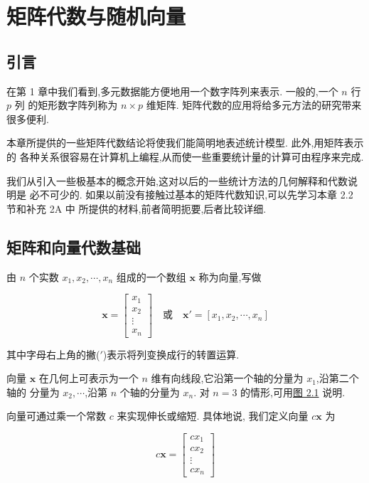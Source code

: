 \chapter{矩阵代数与随机向量}
\label{chap:2}

\section{引言}  %
\label{sec:2.1}

在第 1 章中我们看到,多元数据能方便地用一个数字阵列来表示. 一般的,一个 $n$ 行 $p$ 列
的矩形数字阵列称为 $n\times p$ 维矩阵. 矩阵代数的应用将给多元方法的研究带来很多便利.

本章所提供的一些矩阵代数结论将使我们能简明地表述统计模型. 此外,用矩阵表示的
各种关系很容易在计算机上编程,从而使一些重要统计量的计算可由程序来完成.

我们从引入一些极基本的概念开始,这对以后的一些统计方法的几何解释和代数说明是
必不可少的. 如果以前没有接触过基本的矩阵代数知识,可以先学习本章 2.2 节和补充 2A 中
所提供的材料,前者简明扼要,后者比较详细.

\section{矩阵和向量代数基础}  %
\label{sec:2.2}


由 $n$ 个实数 $x_1,x_2,\cdots,x_n$ 组成的一个数组 $\bm{x}$ 称为向量,写做

\[
\bm{x}=\begin{bmatrix}x_1\\x_2\\\vdots\\x_n\end{bmatrix}
\quad\text{或}\quad
\bm{x}'=[x_1,x_2,\cdots,x_n]
\]

其中字母右上角的撇($'$)表示将列变换成行的转置运算.

向量 $\bm{x}$ 在几何上可表示为一个 $n$ 维有向线段,它沿第一个轴的分量为 $x_1$,沿第二个轴的
分量为 $x_2,\cdots$,沿第 $n$ 个轴的分量为 $x_n$. 对 $n=3$ 的情形,可用\hyperref[fig:2.1]{图 2.1} 说明.

向量可通过乘一个常数 $c$ 来实现伸长或缩短. 具体地说,
我们定义向量 $c\bm{x}$ 为

\[
c\bm{x}=\begin{bmatrix}cx_1\\cx_2\\\vdots\\cx_n\end{bmatrix}
\]

